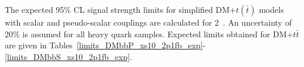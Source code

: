 



The expected 95\% CL signal strength limits for simplified DM+$t(\bar{t})$ models with scalar and pseudo-scalar couplings are calculated for 2~\ifb. An uncertainty of 20\% is assumed for all 
heavy quark samples. 
Expected limits obtained for DM+$t\bar{t}$ are given in Tables~\ref{limits_DMbbP_xs10_2p1fb_exp}-\ref{limits_DMbbS_xs10_2p1fb_exp}. 





\clearpage
